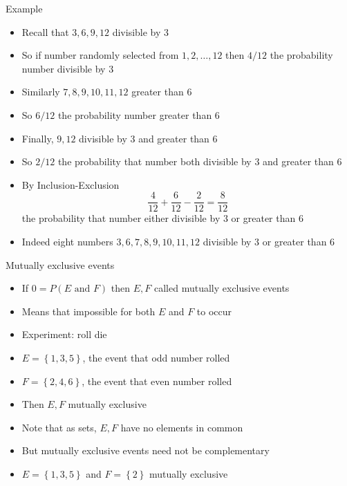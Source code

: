 \documentclass[handout]{beamer}
\theoremstyle{definition}
\begin{document}
\begin{frame}{Example}
\begin{itemize}
\item Recall that $3,6,9,12$ divisible by $3$
\item So if number randomly selected from
$1,2,\ldots,12$ then $4/12$
the probability number divisible by $3$
\item Similarly $7,8,9,10,11,12$ greater than $6$
\item So $6/12$ the probability number
greater than $6$
\item Finally, $9,12$ divisible by $3$ \alert{and}
greater than $6$
\item So $2/12$ the probability that number
both divisible by $3$ and greater than $6$
\item By Inclusion-Exclusion
\[\frac{4}{12}+\frac{6}{12}-\frac{2}{12}=\frac{8}{12}\]
the probability
that number \alert{either} divisible by $3$ or greater than $6$
\item Indeed eight numbers $3,6,7,8,9,10,11,12$ 
divisible by $3$ or greater than $6$
\end{itemize}
\end{frame}

\begin{frame}{Mutually exclusive events}
\begin{itemize}
\item If $0=P\left(\text{$E$ and $F$}\right)$
then $E,F$ called \alert{mutually exclusive events}
\item Means that impossible for \alert{both} $E$ and $F$ to occur
\end{itemize}
\begin{example}
\begin{itemize}
\item Experiment: roll die
\item $E=\left\{1,3,5\right\}$, the event
that odd number rolled
\item $F=\left\{2,4,6\right\}$, the event
that even number rolled
\item Then $E,F$ mutually exclusive
\item Note that as sets, $E,F$ have \alert{no elements} in common
\end{itemize}
\end{example}
\begin{example}
\begin{itemize}
\item But mutually exclusive events need not be \alert{complementary}
\item $E=\left\{1,3,5\right\}$ and $F=\left\{2\right\}$
mutually exclusive
\end{itemize}
\end{example}
\end{frame}
\end{document}
